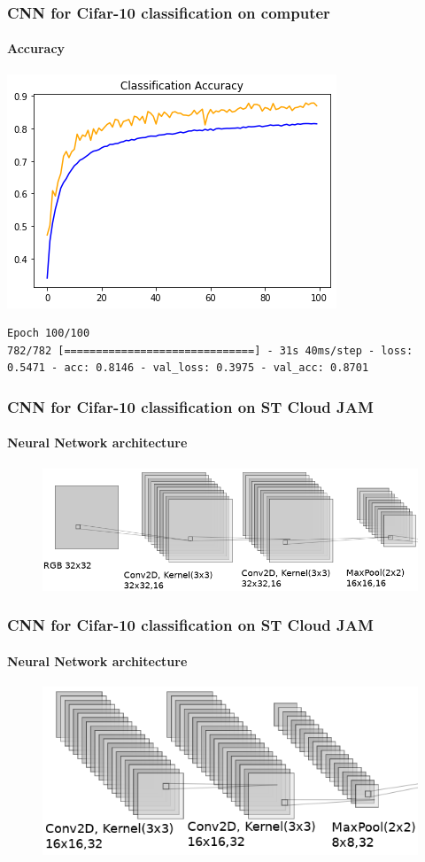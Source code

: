 \documentclass{beamer}
\begin{document}
\begin{frame}[fragile]
\frametitle{CNN for Cifar-10 classification on computer}
\framesubtitle{Accuracy}
	\centering
\includegraphics[scale=0.5]{pictures/Accuracy_plot_Cifar10_Keras}
\begin{lstlisting}
Epoch 100/100
782/782 [==============================] - 31s 40ms/step - loss: 0.5471 - acc: 0.8146 - val_loss: 0.3975 - val_acc: 0.8701
\end{lstlisting}
\end{frame}

\begin{frame}[fragile]
\frametitle{CNN for Cifar-10 classification on ST Cloud JAM}
\framesubtitle{Neural Network architecture}
\begin{figure}
	\centering
	\includegraphics[scale=0.4]{pictures/Cifar_10_lite/cnn1}
\end{figure}
\end{frame}

\begin{frame}[fragile]
\frametitle{CNN for Cifar-10 classification on ST Cloud JAM}
\framesubtitle{Neural Network architecture}
\begin{figure}
	\centering
	\includegraphics[scale=0.4]{pictures/Cifar_10_lite/cnn2}
\end{figure}
\end{frame}
\end{document}

